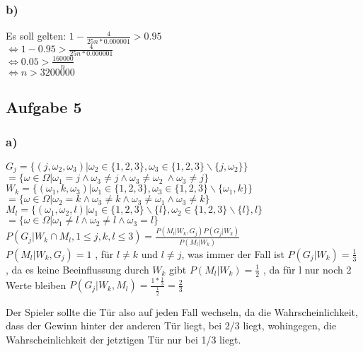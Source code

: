 \documentclass[11pt]{amsart}
\begin{document}
\subsubsection*{b)}

Es soll gelten: $1 - \frac{4}{25n * 0.000001} > 0.95$ \\
$\Leftrightarrow 1-0.95 > \frac{4}{25n * 0.000001}$ \\
$\Leftrightarrow 0.05 > \frac{160000}{n}$ \\
$\Leftrightarrow n > 3 200 000$

\subsection*{Aufgabe 5}

\subsubsection*{a)}

$G_j = \{ (j,\omega_2,\omega_3) | \omega_2 \in \{ 1,2,3 \}, \omega_3 \in \{ 1,2,3 \} \backslash  \{ j , \omega_2 \} \}$ \\
        $= \{ \omega \in \Omega | \omega_1 = j \wedge \omega_3 \not = j \wedge \omega_3 \not = \omega_2\ \wedge \omega_3 \not = j \}$ \\
$W_k = \{ ( \omega_1 , k , \omega_3 ) | \omega_1 \in \{ 1,2,3 \} , \omega_3 \in \{ 1, 2, 3 \} \backslash \{\omega_1 , k \} \}$ \\
     $= \{ \omega \in \Omega | \omega_2 = k \wedge \omega_3 \not = k \wedge \omega_3 \not = \omega_1 \wedge \omega_3 \not = k \}$ \\
$M_l = \{ ( \omega_1 , \omega_2 , l ) | \omega_1 \in \{ 1,2,3 \} \backslash \{ l \} , \omega_2 \in \{ 1, 2, 3 \}  \backslash \{ l \} , l \}$ \\
     $= \{ \omega \in \Omega | \omega_1 \not = l \wedge \omega_2 \not = l \wedge \omega_3 = l \}$ \\

$P(G_j | W_k \cap M_l, 1 \leq j,k,l \leq 3) = \frac{P( M_l | W_k , G_j) P(G_j | W_k)}{P(M_l | W_k)}$ \\
$P(M_l | W_k , G_j ) = 1$ , für $l \not = k$ und $l \not = j$, was immer der Fall ist
$P(G_j | W_k) = \frac{1}{3}$ , da es keine Beeinflussung durch $W_k$ gibt
$P(M_l | W_k) = \frac{1}{2}$ , da für l nur noch 2 Werte bleiben
$P(G_j | W_k , M_l) = \frac{1 * \frac{1}{3}}{\frac{1}{2}} = \frac{2}{3}$

Der Spieler sollte die Tür also auf jeden Fall wechseln, da die Wahrscheinlichkeit, dass der Gewinn
hinter der anderen Tür liegt, bei 2/3 liegt, wohingegen, die Wahrscheinlichkeit der jetztigen Tür
nur bei 1/3 liegt.
\end{document}

